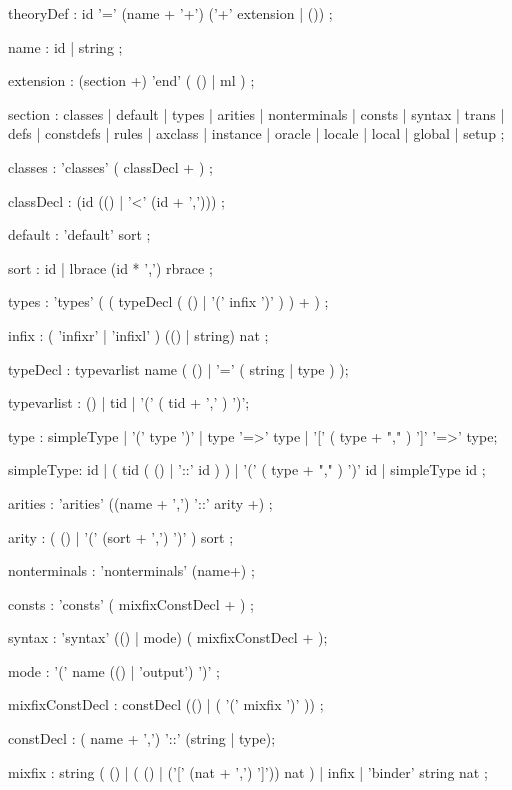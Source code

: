 \begin{rail}

theoryDef : id '=' (name + '+') ('+' extension | ())
          ;

name : id | string
     ;

extension : (section +) 'end' ( () | ml )
          ;

section : classes
        | default
        | types
        | arities
        | nonterminals
        | consts
        | syntax
        | trans
        | defs
        | constdefs
        | rules
        | axclass
        | instance
        | oracle
        | locale
        | local
        | global
        | setup
        ;

classes : 'classes' ( classDecl + )
        ;

classDecl : (id (() | '<' (id + ',')))
          ;

default : 'default' sort 
        ;

sort :  id
     | lbrace (id * ',') rbrace
     ;

types : 'types' ( ( typeDecl ( () | '(' infix ')' ) ) + )
      ;

infix : ( 'infixr' | 'infixl' ) (() | string) nat
      ;

typeDecl : typevarlist name
           ( () | '=' ( string | type ) );

typevarlist : () | tid | '(' ( tid + ',' ) ')';

type : simpleType | '(' type ')' | type '=>' type |
       '[' ( type + "," ) ']' '=>' type;

simpleType: id | ( tid ( () | '::' id ) ) |
            '(' ( type + "," ) ')' id | simpleType id
          ;

arities : 'arities' ((name + ',') '::' arity +)
        ;

arity : ( () | '(' (sort + ',') ')' ) sort
      ;

nonterminals : 'nonterminals' (name+)
             ;

consts : 'consts' ( mixfixConstDecl + )
       ;

syntax : 'syntax' (() | mode) ( mixfixConstDecl + );

mode : '(' name (() | 'output') ')'
     ;

mixfixConstDecl : constDecl (() | ( '(' mixfix ')' ))
                ;

constDecl : ( name + ',') '::' (string | type);

mixfix :  string ( () | ( () | ('[' (nat + ',') ']')) nat )
       |  infix
       | 'binder' string nat ;


\end{rail}
